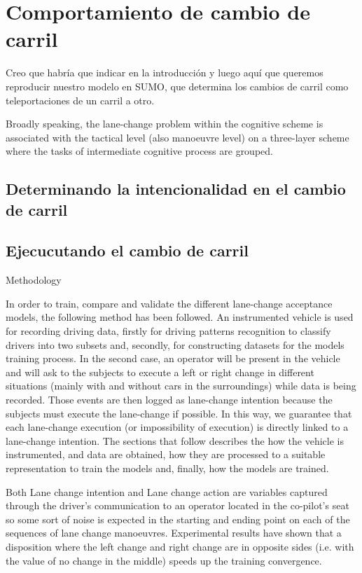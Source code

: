 \chapter{Comportamiento de cambio de carril}
\label{ch:lane-change-submodel}

\TODO Creo que habría que indicar en la introducción y luego aquí que queremos reproducir nuestro modelo en SUMO, que determina los cambios de carril como teleportaciones de un carril a otro.

Broadly speaking, the lane-change problem within the cognitive scheme is associated with the tactical level (also manoeuvre level) on a three-layer scheme where the tasks of intermediate cognitive process are grouped.



\section{Determinando la intencionalidad en el cambio de carril}
\label{s:lane-change-intention}

\section{Ejecucutando el cambio de carril}
\label{s:lane-change-execution}


Methodology

In order to train, compare and validate the different lane-change acceptance models, the following method has been followed. An instrumented vehicle is used for recording driving data, firstly for driving patterns recognition to classify drivers into two subsets and, secondly, for constructing datasets for the models training process. In the second case, an operator will be present in the vehicle and will ask to the subjects to execute a left or right change in different situations (mainly with and without cars in the surroundings) while data is being recorded. Those events are then logged as lane-change intention because the subjects must execute the lane-change if possible. In this way, we guarantee that each lane-change execution (or impossibility of execution) is directly linked to a lane-change intention.
The sections that follow describes the how the vehicle is instrumented, and data are obtained, how they are processed to a suitable representation to train the models and, finally, how the models are trained.

Both Lane change intention and Lane change action are variables captured through the driver’s communication to an operator located in the co-pilot’s seat so some sort of noise is expected in the starting and ending point on each of the sequences of lane change manoeuvres. Experimental results have shown that a disposition where the left change and right change are in opposite sides (i.e. with the value of no change in the middle) speeds up the training convergence.



